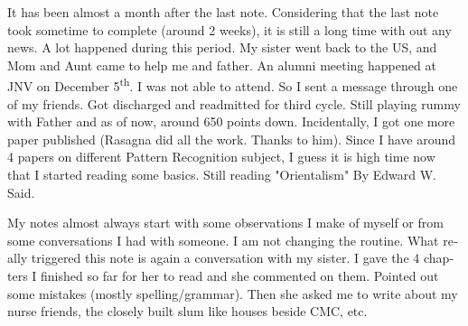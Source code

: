 \begin{english}
\vskip 2pt
\date{Monday December 13 2010}

It has been almost a month after the last note. Considering that the last note took sometime to complete (around 2 weeks), it is still a long time with out any news. A lot happened during this period. My sister went back to the US, and Mom and Aunt came to help me and father. An alumni meeting happened at JNV on December 5\textsuperscript{th}. I was not able to attend. So I sent a message through one of my friends. Got discharged and readmitted for third cycle. Still playing rummy with Father and as of now, around 650 points down. Incidentally, I got one more paper published (Rasagna did all the work. Thanks to him). Since I have around 4 papers on different Pattern Recognition subject, I guess it is high time now that I started reading some basics. Still reading "Orientalism" By Edward W. Said. 

My notes almost always start with some observations I make of myself or from some conversations I had with someone. I am not changing the routine. What really triggered this note is again a conversation with my sister. I gave the 4 chapters I finished so far for her to read and she commented on them. Pointed out some mistakes (mostly spelling/grammar). Then she asked me to write about my nurse friends, the closely built slum like houses beside CMC, etc.
\end{english}
\newpage
